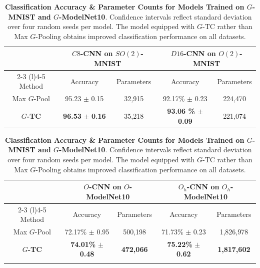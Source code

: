 \begin{table}[H]
\centering
\begin{tabular}{c cc cc}
\toprule
& \multicolumn{2}{c}{ \textbf{$C8$-CNN on $SO(2)$-MNIST}} & \multicolumn{2}{c}{\textbf{$D16$-CNN on $O(2)$-MNIST}} \\
\cmidrule(lr){2-3} \cmidrule(l){4-5}
Method & Accuracy & Parameters & Accuracy & Parameters \\
\midrule
Max $G$-Pool & 95.23 $\pm$ 0.15 & 32,915 & 92.17\% $\pm$ 0.23 & 224,470 \\
\textbf{$G$-TC} & \textbf{96.53} $\pm$ \textbf{0.16}  &  35,218 & \textbf{93.06 \% $\pm$ 0.09} & 221,074 \\
\bottomrule
\end{tabular}

\begin{tabular}{c  cc cc}
\toprule
& \multicolumn{2}{c}{ \textbf{$O$-CNN on $O$-ModelNet10}} & \multicolumn{2}{c}{\textbf{$O_h$-CNN on $O_h$-ModelNet10}} \\
\cmidrule(lr){2-3} \cmidrule(l){4-5}
Method & Accuracy & Parameters & Accuracy & Parameters \\
\midrule
Max $G$-Pool & 72.17\% $\pm$ 0.95 & 500,198 & 71.73\% $\pm$ 0.23  & 1,826,978 \\
\textbf{$G$-TC} & \textbf{74.01\%} $\pm$ \textbf{0.48} & \textbf{472,066} & \textbf{75.22\%} $\pm$ \textbf{0.62} & \textbf{1,817,602} \\

\bottomrule \\
\end{tabular}

  \caption{\textbf{Classification Accuracy \& Parameter Counts for Models Trained on $G$-MNIST and $G$-ModelNet10}. Confidence intervals reflect standard deviation over four random seeds per model. The model equipped with $G$-TC rather than Max $G$-Pooling obtains improved classification performance on all datasets.}
\label{tab:mnist}
\end{table}

